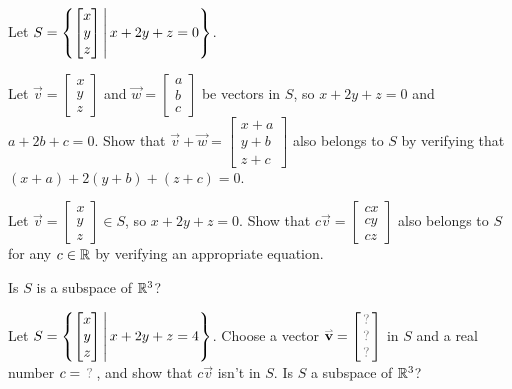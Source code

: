 \begin{activity}{15}
Let \(S=\left\{\begin{bmatrix} x \\ y \\ z \end{bmatrix}\,\middle|\, x+2y+z=0\right\}\).

\begin{subactivity}
  Let \(\vec{v}=\begin{bmatrix} x \\ y \\ z \end{bmatrix}\) and
  \(\vec{w} = \begin{bmatrix} a \\ b \\ c \end{bmatrix} \) be vectors in \(S\),
  so \(x+2y+z=0\) and \(a+2b+c=0\). Show that
  \(\vec v+\vec w = \begin{bmatrix} x+a \\ y+b \\ z+c \end{bmatrix}\)
  also belongs to \(S\) by verifying that \((x+a)+2(y+b)+(z+c)=0\).
\end{subactivity}
\begin{subactivity}
  Let \(\vec{v}=\begin{bmatrix} x \\ y \\ z \end{bmatrix}\in S\), so
  \(x+2y+z=0\). Show that \(c\vec v=\begin{bmatrix}cx\\cy\\cz\end{bmatrix}\) 
  also belongs to \(S\) for any \(c\in\mathbb{R}\) by verifying
  an appropriate equation.
\end{subactivity}
\begin{subactivity}
  Is \(S\) is a subspace of \(\mathbb{R}^3\)?
\end{subactivity}
\end{activity}

\begin{activity}{10}
Let \(S=\left\{\begin{bmatrix} x \\ y \\ z \end{bmatrix}\,\middle|\, x+2y+z=4\right\}\).
Choose a vector
\(\vec v=\begin{bmatrix} \unknown\\\unknown\\\unknown \end{bmatrix}\) in \(S\)
and a real number \(c=\unknown\), and show that \(c\vec v\) isn't in \(S\).
Is \(S\) a subspace of \(\mathbb{R}^3\)?
\end{activity}

